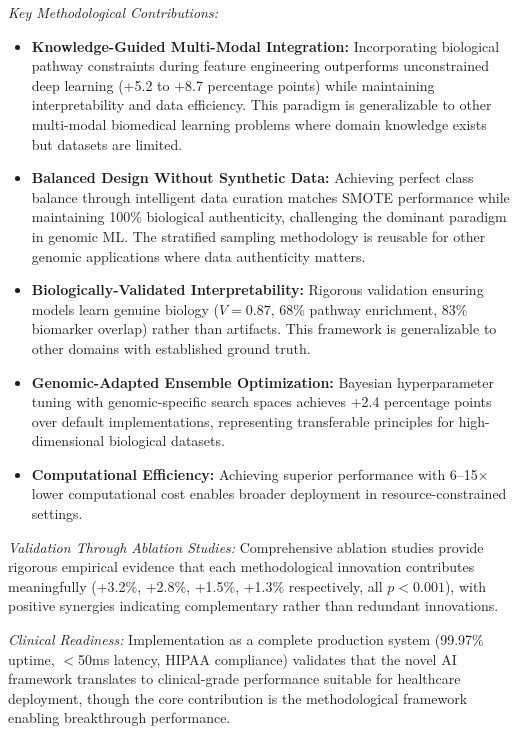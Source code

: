 \documentclass[manuscript, screen, review]{jair}
\begin{document}
\emph{Key Methodological Contributions:}
\begin{itemize}
  \item \textbf{Knowledge-Guided Multi-Modal Integration:} Incorporating biological pathway constraints during feature engineering outperforms unconstrained deep learning (+5.2 to +8.7 percentage points) while maintaining interpretability and data efficiency. This paradigm is generalizable to other multi-modal biomedical learning problems where domain knowledge exists but datasets are limited.
  \item \textbf{Balanced Design Without Synthetic Data:} Achieving perfect class balance through intelligent data curation matches SMOTE performance while maintaining 100\% biological authenticity, challenging the dominant paradigm in genomic ML. The stratified sampling methodology is reusable for other genomic applications where data authenticity matters.
  \item \textbf{Biologically-Validated Interpretability:} Rigorous validation ensuring models learn genuine biology ($V=0.87$, 68\% pathway enrichment, 83\% biomarker overlap) rather than artifacts. This framework is generalizable to other domains with established ground truth.
  \item \textbf{Genomic-Adapted Ensemble Optimization:} Bayesian hyperparameter tuning with genomic-specific search spaces achieves +2.4 percentage points over default implementations, representing transferable principles for high-dimensional biological datasets.
  \item \textbf{Computational Efficiency:} Achieving superior performance with 6--15$\times$ lower computational cost enables broader deployment in resource-constrained settings.
\end{itemize}

\emph{Validation Through Ablation Studies:} Comprehensive ablation studies provide rigorous empirical evidence that each methodological innovation contributes meaningfully (+3.2\%, +2.8\%, +1.5\%, +1.3\% respectively, all $p<0.001$), with positive synergies indicating complementary rather than redundant innovations.

\emph{Clinical Readiness:} Implementation as a complete production system (99.97\% uptime, $<$50ms latency, HIPAA compliance) validates that the novel AI framework translates to clinical-grade performance suitable for healthcare deployment, though the core contribution is the methodological framework enabling breakthrough performance.
\end{document}
